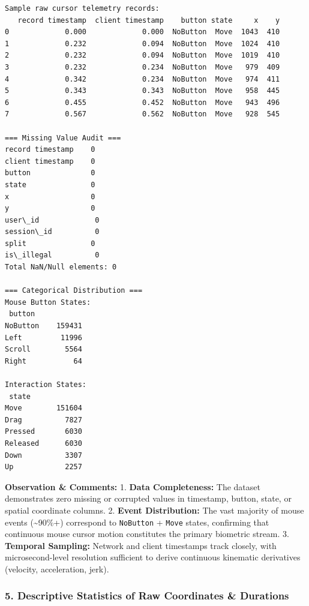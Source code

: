 \documentclass[11pt]{article}
\begin{document}
    \begin{Verbatim}[commandchars=\\\{\}]
Sample raw cursor telemetry records:
   record timestamp  client timestamp    button state     x    y
0             0.000             0.000  NoButton  Move  1043  410
1             0.232             0.094  NoButton  Move  1024  410
2             0.232             0.094  NoButton  Move  1019  410
3             0.232             0.234  NoButton  Move   979  409
4             0.342             0.234  NoButton  Move   974  411
5             0.343             0.343  NoButton  Move   958  445
6             0.455             0.452  NoButton  Move   943  496
7             0.567             0.562  NoButton  Move   928  545

=== Missing Value Audit ===
record timestamp    0
client timestamp    0
button              0
state               0
x                   0
y                   0
user\_id             0
session\_id          0
split               0
is\_illegal          0
Total NaN/Null elements: 0

=== Categorical Distribution ===
Mouse Button States:
 button
NoButton    159431
Left         11996
Scroll        5564
Right           64

Interaction States:
 state
Move        151604
Drag          7827
Pressed       6030
Released      6030
Down          3307
Up            2257
    \end{Verbatim}

    \textbf{Observation \& Comments:} 1. \textbf{Data Completeness:} The
dataset demonstrates zero missing or corrupted values in timestamp,
button, state, or spatial coordinate columns. 2. \textbf{Event
Distribution:} The vast majority of mouse events (\textasciitilde90\%+)
correspond to \texttt{NoButton} + \texttt{Move} states, confirming that
continuous mouse cursor motion constitutes the primary biometric stream.
3. \textbf{Temporal Sampling:} Network and client timestamps track
closely, with microsecond-level resolution sufficient to derive
continuous kinematic derivatives (velocity, acceleration, jerk).

    \subsubsection{5. Descriptive Statistics of Raw Coordinates \&
Durations}\label{descriptive-statistics-of-raw-coordinates-durations}
\end{document}
